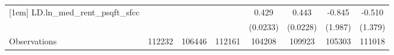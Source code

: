 {\begin{tabular}{l*{7}{c}}
[1em]
LD.ln\_med\_rent\_psqft\_sfcc&                  &                  &                  &    0.429\sym{***}&    0.443\sym{***}&   -0.845         &   -0.510         \\
          &                  &                  &                  & (0.0233)         & (0.0228)         &  (1.987)         &  (1.379)         \\
\hline
Observations&   112232         &   106446         &   112161         &   104208         &   109923         &   105303         &   111018         \\
\hline\hline
\end{tabular}
}
